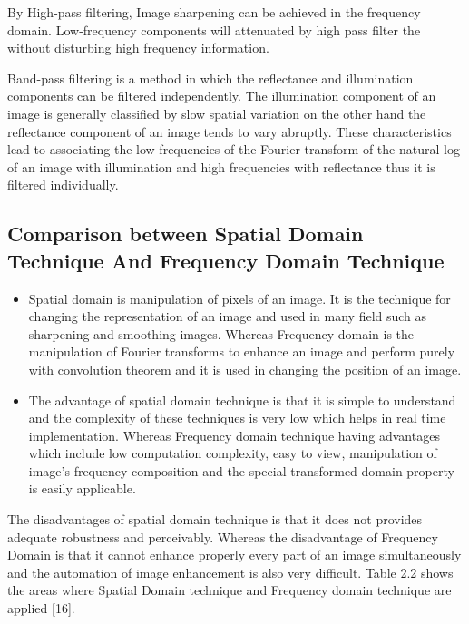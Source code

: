 By High-pass filtering, Image sharpening can be achieved in the frequency domain. Low-frequency components will attenuated by high pass filter the without disturbing high frequency information.

Band-pass filtering is a method in which the reflectance and illumination components can be filtered independently. The illumination component of an image is generally classified by slow spatial variation on the other hand the reflectance component of an image tends to vary abruptly. These characteristics lead to associating the low frequencies of the Fourier transform of the natural log of an image with illumination and high frequencies with reflectance thus it is filtered individually.

\subsection{Comparison between Spatial Domain Technique And Frequency Domain Technique}
\begin{itemize}
	\item Spatial domain is manipulation of pixels of an image. It is the technique for changing the representation of an image and used in many field such as sharpening and smoothing images. Whereas Frequency domain is the manipulation of Fourier transforms to enhance an image and perform purely with convolution theorem and it is used in changing the position of an image. 
	\item The advantage of spatial domain technique is that it is simple to understand and the complexity of these techniques is very low which helps in real time implementation. Whereas Frequency domain technique having advantages which include low computation complexity, easy to view, manipulation of image’s frequency composition and the special transformed domain property is easily applicable.
	
\end{itemize}

The disadvantages of spatial domain technique is that it does not provides adequate robustness and perceivably. Whereas the disadvantage of Frequency Domain is that it cannot enhance properly every part of an image simultaneously and the automation of image enhancement is also very difficult. Table 2.2 shows the areas where Spatial Domain technique and Frequency domain technique are applied [16].

